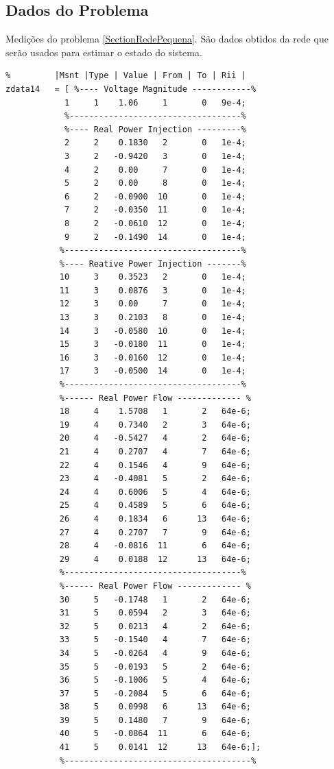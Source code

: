 \subsection{Dados do Problema}
\label{SectionDados}
Medições do problema \ref{SectionRedePequena}. São dados obtidos da rede que serão usados para estimar o estado do sistema.
\begin{verbatim}
%         |Msnt |Type | Value | From | To | Rii | 
zdata14   = [ %---- Voltage Magnitude ------------%
            1     1    1.06     1       0   9e-4;
            %-----------------------------------%
            %---- Real Power Injection ---------%
            2     2    0.1830   2       0   1e-4;
            3     2   -0.9420   3       0   1e-4; 
            4     2    0.00     7       0   1e-4;
            5     2    0.00     8       0   1e-4; 
            6     2   -0.0900  10       0   1e-4;
            7     2   -0.0350  11       0   1e-4;
            8     2   -0.0610  12       0   1e-4; 
            9     2   -0.1490  14       0   1e-4;
           %------------------------------------%
           %---- Reative Power Injection -------%
           10     3    0.3523   2       0   1e-4;
           11     3    0.0876   3       0   1e-4; 
           12     3    0.00     7       0   1e-4;
           13     3    0.2103   8       0   1e-4; 
           14     3   -0.0580  10       0   1e-4;
           15     3   -0.0180  11       0   1e-4;
           16     3   -0.0160  12       0   1e-4; 
           17     3   -0.0500  14       0   1e-4;
           %------------------------------------%
           %------ Real Power Flow ------------- %
           18     4    1.5708   1       2   64e-6;
           19     4    0.7340   2       3   64e-6;
           20     4   -0.5427   4       2   64e-6;
           21     4    0.2707   4       7   64e-6;
           22     4    0.1546   4       9   64e-6;
           23     4   -0.4081   5       2   64e-6;
           24     4    0.6006   5       4   64e-6;
           25     4    0.4589   5       6   64e-6;
           26     4    0.1834   6      13   64e-6;
           27     4    0.2707   7       9   64e-6;
           28     4   -0.0816  11       6   64e-6;
           29     4    0.0188  12      13   64e-6;
           %------------------------------------%
           %------ Real Power Flow ------------- %
           30     5   -0.1748   1       2   64e-6;
           31     5    0.0594   2       3   64e-6;
           32     5    0.0213   4       2   64e-6;
           33     5   -0.1540   4       7   64e-6;
           34     5   -0.0264   4       9   64e-6;
           35     5   -0.0193   5       2   64e-6;
           36     5   -0.1006   5       4   64e-6;
           37     5   -0.2084   5       6   64e-6;
           38     5    0.0998   6      13   64e-6;
           39     5    0.1480   7       9   64e-6;
           40     5   -0.0864  11       6   64e-6;
           41     5    0.0141  12      13   64e-6;];
           %--------------------------------------%
\end{verbatim}

